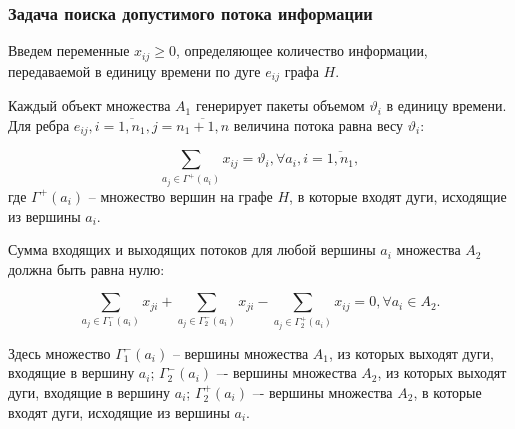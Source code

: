 \begin{frame}
    \frametitle{Задача поиска допустимого потока информации}
    \fontsize{10pt}{5.2}\selectfont
    \justifying


    Введем переменные $x_{ij} \geqslant 0$, определяющее количество информации, передаваемой в единицу времени по дуге $e_{ij}$ графа $H$.

    Каждый объект множества $A_1$ генерирует пакеты объемом $\vartheta_i$ в единицу времени. Для ребра $e_{ij}, i = \overline{1,n_1}, j = \overline{n_1+1,n}$ величина потока равна весу $\vartheta_i$:

    \begin{equation}\label{eq:part2_1.1}
        \sum_{a_j \in \Gamma^+(a_i)} x_{ij} = \vartheta_i, \forall a_i, i=\overline{1, n_1},
    \end{equation}
    где $\Gamma^+(a_i)$ – множество вершин на графе $H$, в которые входят дуги, исходящие из вершины $a_i$. 


    Сумма входящих и выходящих потоков для любой вершины $a_i$  множества $A_2$ должна быть равна нулю:

    \begin{equation}\label{eq:part2_1.2}
        \sum_{a_j \in \Gamma_1^-(a_i)} x_{ji} + \sum_{a_j \in \Gamma_2^-(a_i)} x_{ji} -  \sum_{a_j \in \Gamma_2^+(a_i)} x_{ij} =0 ,\forall a_i \in A_2. 
    \end{equation}

    Здесь множество $\Gamma_1^-(a_i)$ -- вершины множества $A_1$, из которых выходят дуги, входящие в вершину $a_i$; $\Gamma_2^-(a_i)$ –- вершины множества $A_2$, из которых выходят дуги, входящие в  вершину $a_i$; $\Gamma_2^+(a_i)$ –- вершины множества $A_2$, в которые входят дуги, исходящие из вершины $a_i$.
   

\end{frame}


